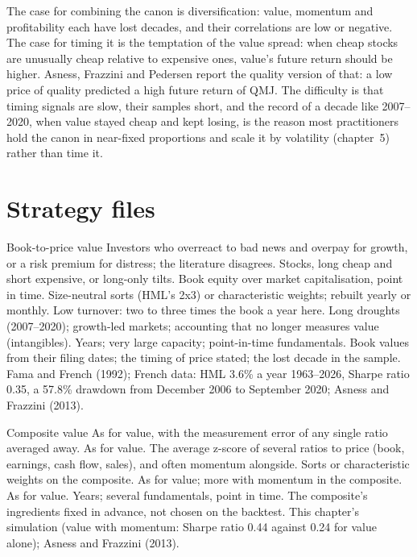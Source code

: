 The case for combining the canon is diversification: value, momentum and profitability each have lost decades, and their correlations are low or negative.
The case for timing it is the temptation of the value spread: when cheap stocks are unusually cheap relative to expensive ones, value's future return
should be higher. Asness, Frazzini and Pedersen report the quality version of that: a low price of quality predicted a high future return of QMJ. The
difficulty is that timing signals are slow, their samples short, and the record of a decade like 2007--2020, when value stayed cheap and kept losing, is the
reason most practitioners hold the canon in near-fixed proportions and scale it by volatility (chapter~5) rather than time it.

\section{Strategy files}

\begin{strategyfile}{Book-to-price value}\label{strat:s1:value-quality-and-low-risk:value}
 Investors who overreact to bad news and overpay for growth, or a risk premium for distress; the literature disagrees.
 Stocks, long cheap and short expensive, or long-only tilts.
 Book equity over market capitalisation, point in time.
 Size-neutral sorts (HML's 2x3) or characteristic weights; rebuilt yearly or monthly.
 Low turnover: two to three times the book a year here.
 Long droughts (2007--2020); growth-led markets; accounting that no longer measures value (intangibles).
 Years; very large capacity; point-in-time fundamentals.
 Book values from their filing dates; the timing of price stated; the lost decade in the sample.
 Fama and French (1992); French data: HML 3.6\% a year 1963--2026, Sharpe ratio 0.35, a 57.8\% drawdown from December 2006 to September 2020;
Asness and Frazzini (2013).
\end{strategyfile}

\begin{strategyfile}{Composite value}\label{strat:s1:value-quality-and-low-risk:composite}
 As for value, with the measurement error of any single ratio averaged away.
 As for value.
 The average z-score of several ratios to price (book, earnings, cash flow, sales), and often momentum alongside.
 Sorts or characteristic weights on the composite.
 As for value; more with momentum in the composite.
 As for value.
 Years; several fundamentals, point in time.
 The composite's ingredients fixed in advance, not chosen on the backtest.
 This chapter's simulation (value with momentum: Sharpe ratio 0.44 against 0.24 for value alone); Asness and Frazzini (2013).
\end{strategyfile}

